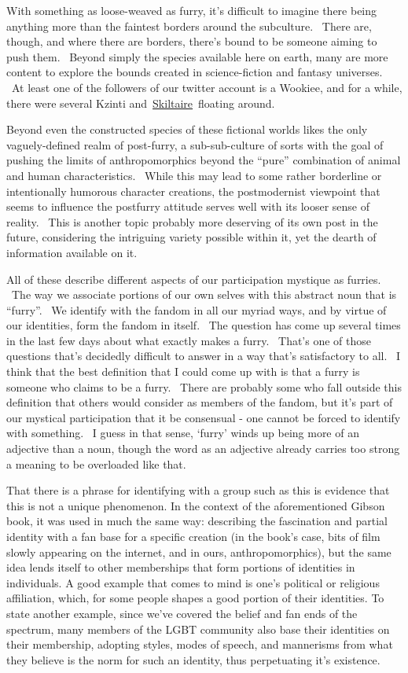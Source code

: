 With something as loose-weaved as furry, it's difficult to imagine there
being anything more than the faintest borders around the subculture.
~There are, though, and where there are borders, there's bound to be
someone aiming to push them. ~Beyond simply the species available here
on earth, many are more content to explore the bounds created in
science-fiction and fantasy universes. ~At least one of the followers of
our twitter account is a Wookiee, and for a while, there were several
Kzinti and~\href{http://skiltaire.net}{Skiltaire}~floating around.

Beyond even the constructed species of these fictional worlds likes the
only vaguely-defined realm of post-furry, a sub-sub-culture of sorts
with the goal of pushing the limits of anthropomorphics beyond the
``pure'' combination of animal and human characteristics. ~While this
may lead to some rather borderline or intentionally humorous character
creations, the postmodernist viewpoint that seems to influence the
postfurry attitude serves well with its looser sense of reality. ~This
is another topic probably more deserving of its own post in the future,
considering the intriguing variety possible within it, yet the dearth of
information available on it.

All of these describe different aspects of our participation mystique as
furries. ~The way we associate portions of our own selves with this
abstract noun that is ``furry''. ~We identify with the fandom in all our
myriad ways, and by virtue of our identities, form the fandom in itself.
~The question has come up several times in the last few days about what
exactly makes a furry. ~That's one of those questions that's decidedly
difficult to answer in a way that's satisfactory to all. ~I think that
the best definition that I could come up with is that a furry is someone
who claims to be a furry. ~There are probably some who fall outside this
definition that others would consider as members of the fandom, but it's
part of our mystical participation that it be consensual - one cannot be
forced to identify with something. ~I guess in that sense, `furry' winds
up being more of an adjective than a noun, though the word as an
adjective already carries too strong a meaning to be overloaded like
that.

That there is a phrase for identifying with a group such as this is
evidence that this is not a unique phenomenon. In the context of the
aforementioned Gibson book, it was used in much the same way: describing
the fascination and partial identity with a fan base for a specific
creation (in the book's case, bits of film slowly appearing on the
internet, and in ours, anthropomorphics), but the same idea lends itself
to other memberships that form portions of identities in individuals. A
good example that comes to mind is one's political or religious
affiliation, which, for some people shapes a good portion of their
identities. To state another example, since we've covered the belief and
fan ends of the spectrum, many members of the LGBT community also base
their identities on their membership, adopting styles, modes of speech,
and mannerisms from what they believe is the norm for such an identity,
thus perpetuating it's existence.

